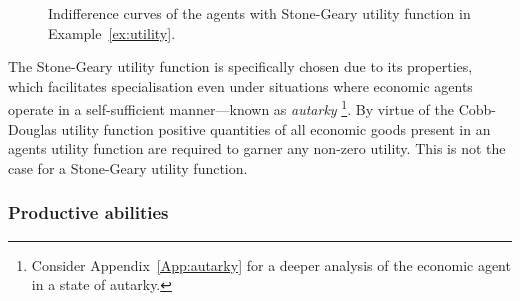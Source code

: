 \begin{figure}[t]
\begin{center}
\end{center}
\caption[Indifference curves of the agents with Stone-Geary utility function]{Indifference curves of the agents with Stone-Geary utility function in Example~\ref{ex:utility}.}
\label{fig:utility}
\end{figure}
The Stone-Geary utility function is specifically chosen due to its properties, which facilitates specialisation even under situations where economic agents operate in a self-sufficient manner---known as \emph{autarky} \footnote{Consider Appendix~\ref{App:autarky} for a deeper analysis of the economic agent in a state of autarky.}. By virtue of the Cobb-Douglas utility function positive quantities of all economic goods present in an agents utility function are required to garner any non-zero utility. This is not the case for a Stone-Geary utility function.

\subsubsection{Productive abilities}

